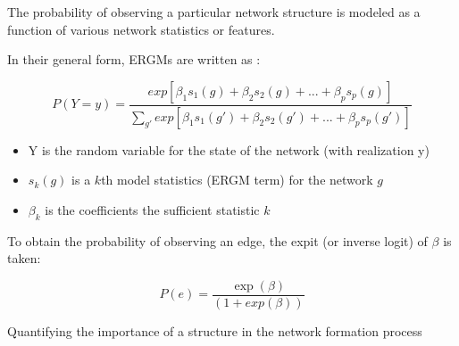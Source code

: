 The probability of observing a particular network structure is modeled as a function of various network statistics or features.

In their general form, ERGMs are written as \citep{hunter2008}:

$$
P(Y=y) = \frac{exp[\beta_1 s_1(g) + \beta_2 s_2(g) + ... + \beta_p s_p(g)]}{\sum\limits_{g'} exp[\beta_1 s_1(g') + \beta_2 s_2(g') + ... + \beta_p s_p(g')]}
$$

\begin{itemize}
    \item Y is the random variable for the state of the network (with realization y)
    \item $s_k(g)$ is a $k$th model statistics (ERGM term) for the network $g$
    \item $\beta_k$ is the coefficients the sufficient statistic $k$
\end{itemize}









\break

To obtain the probability of observing an edge, the expit (or inverse logit) of $\beta$ is taken:

$$
P(e) = \frac{\exp(\beta)}{(1 + exp(\beta))}
$$

Quantifying the importance of a structure in the network formation process
















